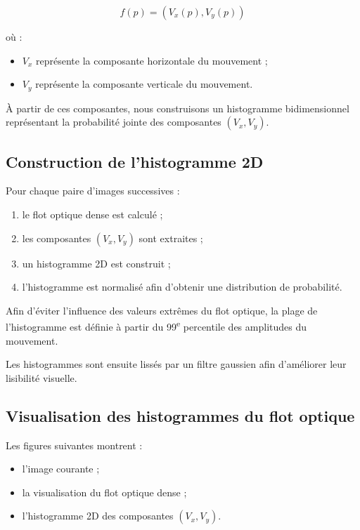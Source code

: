 \documentclass[11pt,a4paper]{article}
\begin{document}
    \[
    f(p) = (V_x(p), V_y(p))
    \]
    
    où :
    \begin{itemize}
        \item $V_x$ représente la composante horizontale du mouvement ;
        \item $V_y$ représente la composante verticale du mouvement.
    \end{itemize}
    
    À partir de ces composantes, nous construisons un histogramme bidimensionnel représentant la probabilité jointe des composantes $(V_x, V_y)$.
    
    \subsection*{Construction de l’histogramme 2D}
    
    Pour chaque paire d’images successives :
    \begin{enumerate}
        \item le flot optique dense est calculé ;
        \item les composantes $(V_x, V_y)$ sont extraites ;
        \item un histogramme 2D est construit ;
        \item l’histogramme est normalisé afin d’obtenir une distribution de probabilité.
    \end{enumerate}
    
    Afin d’éviter l’influence des valeurs extrêmes du flot optique, la plage de l’histogramme est définie à partir du 99\textsuperscript{e} percentile des amplitudes du mouvement.
    
    \vspace{0.3cm}
    
    Les histogrammes sont ensuite lissés par un filtre gaussien afin d’améliorer leur lisibilité visuelle.
    
    \subsection*{Visualisation des histogrammes du flot optique}
    
    Les figures suivantes montrent :
    \begin{itemize}
        \item l’image courante ;
        \item la visualisation du flot optique dense ;
        \item l’histogramme 2D des composantes $(V_x,V_y)$.
    \end{itemize}
    
\end{document}
